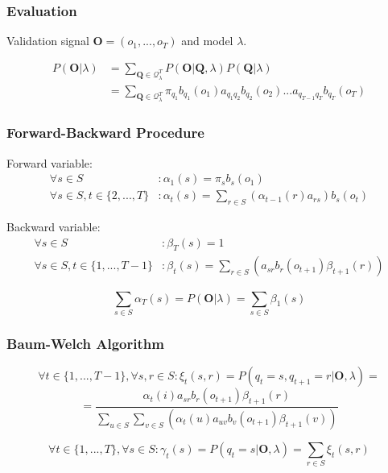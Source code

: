 \begin{frame}
	\frametitle{Evaluation}
	
	Validation signal $\mathbf{O}=(o_1,...,o_T)$ and model $\lambda$.
	
	\begin{align*}
		P(\mathbf{O}|\lambda)&=\sum_{\mathbf{Q}\in\mathcal{Q}^T_\lambda}{P(\mathbf{O}|\mathbf{Q},\lambda)P(\mathbf{Q}|\lambda)}\\
		&=\sum_{\mathbf{Q}\in\mathcal{Q}^T_\lambda}{\pi_{q_1}b_{q_1}(o_1)a_{q_1q_2}b_{q_2}(o_2)...a_{q_{T-1}q_T}b_{q_T}(o_T)}
	\end{align*}
\end{frame}

\begin{frame}
	\frametitle{Forward-Backward Procedure}
	
	Forward variable:
	\begin{align*}
		\forall s\in S&: \alpha_1(s)=\pi_sb_{s}(o_1)\\
		\forall s\in S, t\in\{2, ..., T\}&: \alpha_t(s) = \sum_{r \in S}{(\alpha_{t-1}(r)a_{rs})}b_{s}(o_t)
	\end{align*}
	
	Backward variable:
	\begin{align*}
		\forall s\in S&:\beta_T(s)=1\\
		\forall s\in S, t\in\{1, ..., T-1\}&:\beta_t(s)=\sum_{r\in S}{(a_{sr}b_{r}(o_{t+1})\beta_{t+1}(r))}
	\end{align*}
	
	$$\sum_{s\in S}{\alpha_T(s)} = P(\mathbf{O}|\lambda)=\sum_{s\in S}{\beta_1(s)}$$
	
\end{frame}

\begin{frame}
	\frametitle{Baum-Welch Algorithm}
	
	$$\forall t\in\{1,...,T-1\},\forall s,r\in S: \xi_t(s,r) = P(q_t =s, q_{t+1}=r|\mathbf{O},\lambda)=$$
	$$=\frac{\alpha_t(i)a_{sr}b_{r}(o_{t+1})\beta_{t+1}(r)}{\sum_{u\in S}\sum_{v\in S}(\alpha_t(u)a_{uv}b_{v}(o_{t+1})\beta_{t+1}(v))}$$
		
	$$\forall t\in\{1,...,T\},\forall s\in S: \gamma_t(s) =P(q_t=s|\mathbf{O},\lambda)=\sum_{r\in S}\xi_t(s,r)$$
\end{frame}


